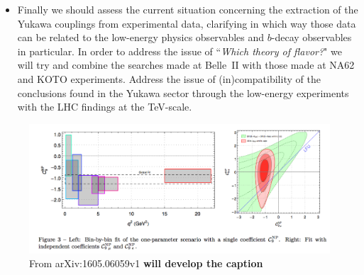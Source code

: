 \begin{itemize}
\item Finally we should assess the current situation concerning the extraction of the Yukawa couplings from experimental data, clarifying in which way those data can be related to the low-energy physics observables and 
$b$-decay observables in particular. In order to address the issue of ``{\it Which theory of flavor?}" we will try and combine the searches made at Belle~II with those made at NA62 and KOTO experiments.  
Address the issue of (in)compatibility of the conclusions found in the Yukawa sector through the low-energy experiments with the LHC findings at the TeV-scale. 
\end{itemize} 



\begin{figure}[!htb]
\begin{center}
\includegraphics[width=14cm]{rare_fit.pdf}
\end{center}
\caption{ From arXiv:1605.06059v1 \bf{will develop the caption}}%
\label{figphis}%
\end{figure}



